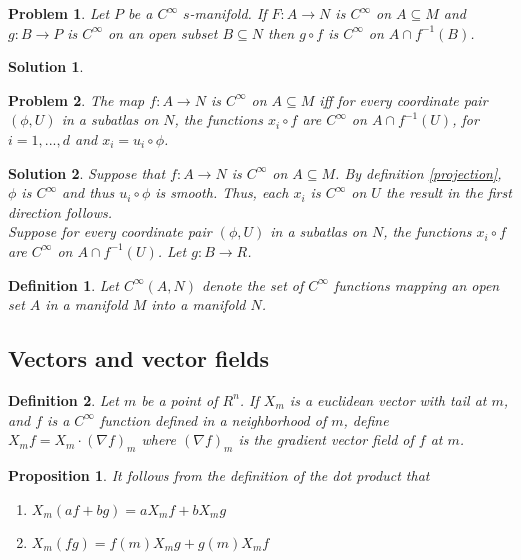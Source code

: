 \documentclass{article}
\theoremstyle{problemstyle}
\newtheorem{problem}{Problem}
\theoremstyle{problemstyle}
\newtheorem{solution}{Solution}
\theoremstyle{problemstyle}
\newtheorem{definition}{Definition}
\theoremstyle{problemstyle}
\newtheorem{proposition}{Proposition}
\theoremstyle{problemstyle}
\begin{document}
\begin{problem}
Let $P$ be a $C^{\infty}$ $s$-manifold. If $F:A\rightarrow N$ is $C^\infty$ on $A \subseteq M$ and $g:B \rightarrow P$ is $C^\infty$ on an open subset $B \subseteq N$ then $g \circ f$ is $C^\infty$ on $A \cap f^{-1}(B)$. 
\end{problem}

\begin{solution}

\end{solution}

\begin{problem}
The map $f:A \rightarrow N$ is $C^\infty$ on $A \subseteq M$ iff for every coordinate pair $(\phi,U)$ in a subatlas on $N$, the functions $x_i \circ f$ are $C^\infty$ on $A \cap f^{-1}(U)$, for $i = 1,...,d$ and $x_i = u_i \circ \phi$.
\end{problem}

\begin{solution}
Suppose that $f:A \rightarrow N$ is $C^\infty$ on $A \subseteq M$. By definition \ref{projection}, $\phi$ is $C^\infty$ and thus $u_i \circ \phi$ is smooth. Thus, each $x_i$ is $C^\infty$ on $U$ the result in the first direction follows. \\

Suppose for every coordinate pair $(\phi,U)$ in a subatlas on $N$, the functions $x_i \circ f$ are $C^\infty$ on $A \cap f^{-1}(U)$. Let $g:B \rightarrow R$. 
\end{solution}

\begin{definition}
Let $C^\infty(A,N)$ denote the set of $C^\infty$ functions mapping an open set $A$ in a manifold $M$ into a manifold $N$. 
\end{definition}

\subsection{Vectors and vector fields}

\begin{definition}
Let $m$ be a point of $R^n$. If $X_m$ is a euclidean vector with tail at $m$, and $f$ is a $C^\infty$ function defined in a neighborhood of $m$, define $X_mf = X_m \cdot (\nabla f)_m$ where $(\nabla f)_m$ is the gradient vector field of $f$ at $m$. 
\end{definition}

\begin{proposition}
It follows from the definition of the dot product that 
\begin{enumerate}
\item $X_m(af+bg) = aX_mf+bX_mg$
\item $X_m(fg) = f(m)X_mg+g(m)X_mf$
\end{enumerate}
\end{proposition}
\end{document}
